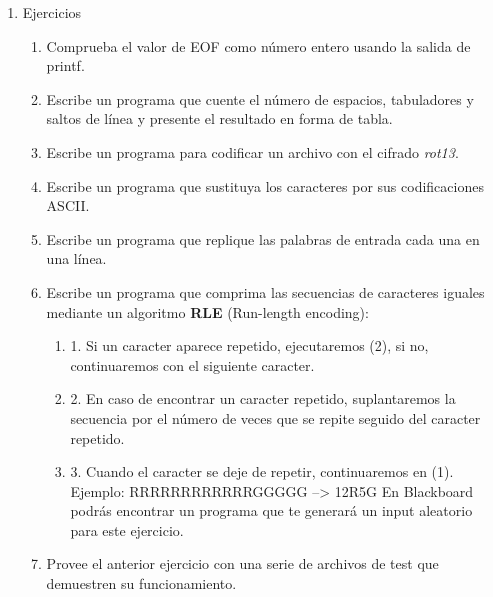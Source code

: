 \documentclass[a4paper,oneside]{article}
\begin{document}
\begin{enumerate}
\begin{verbatim}
main()
{
  int c, nl, nw, nc, state;
  state = OUT;
  nl = nw = nc = 0;
  while ((c = getchar()) != EOF)
  {
    ++nc;
    if (c == '\n')
      ++nl;
    if (c == ' ' || c == '\n' || c = '\t')
      state = OUT;
    else if (state == OUT)
    {
      state = IN;
      ++nw;
    }
  }
  printf("%d %d %d\n", nl, nw, nc);
}
    \end{verbatim}
  \item{Ejercicios}
    \begin{enumerate}
    \item Comprueba el valor de EOF como número entero usando la salida de printf.
    \item Escribe un programa que cuente el número de espacios, tabuladores y saltos de línea y presente el resultado en forma de tabla.
    \item Escribe un programa para codificar un archivo con el cifrado \textit{rot13}.
    \item Escribe un programa que sustituya los caracteres por sus codificaciones ASCII.
    \item Escribe un programa que replique las palabras de entrada cada una en una línea.
    \item Escribe un programa que comprima las secuencias de caracteres iguales mediante un algoritmo \textbf{RLE} (Run-length encoding):
      \begin{enumerate}
      \item 1. Si un caracter aparece repetido, ejecutaremos (2), si no, continuaremos con el siguiente caracter.
      \item 2. En caso de encontrar un caracter repetido, suplantaremos la secuencia por el número de veces que se repite seguido del caracter repetido.
      \item 3. Cuando el caracter se deje de repetir, continuaremos en (1).
      \newline
      Ejemplo: RRRRRRRRRRRRGGGGG --> 12R5G
      En Blackboard podrás encontrar un programa que te generará un input aleatorio para este ejercicio.
      \end{enumerate}
    \item Provee el anterior ejercicio con una serie de archivos de test que demuestren su funcionamiento.
    \end{enumerate}
  \end{enumerate}
\end{document}
